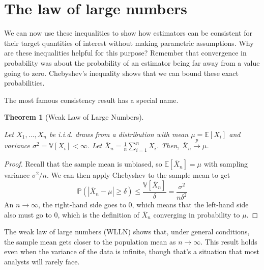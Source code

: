 \documentclass[
  letterpaper,
  DIV=11,
  numbers=noendperiod]{scrreprt}
\newcommand{\E}{\mathbb{E}}
\newcommand{\V}{\mathbb{V}}
\renewcommand{\P}{\mathbb{P}}
\newcommand{\Xbar}{\overline{X}}
\newcommand{\inprob}{\overset{p}{\to}}
\theoremstyle{definition}
\theoremstyle{plain}
\newtheorem{theorem}{Theorem}[chapter]
\theoremstyle{definition}
\theoremstyle{remark}
\begin{document}
\hypertarget{the-law-of-large-numbers}{%
\section{The law of large numbers}\label{the-law-of-large-numbers}}

We can now use these inequalities to show how estimators can be
consistent for their target quantities of interest without making
parametric assumptions. Why are these inequalities helpful for this
purpose? Remember that convergence in probability was about the
probability of an estimator being far away from a value going to zero.
Chebyshev's inequality shows that we can bound these exact
probabilities.

The most famous consistency result has a special name.

\begin{theorem}[Weak Law of Large
Numbers]\protect\hypertarget{thm-lln}{}\label{thm-lln}

Let \(X_1, \ldots, X_n\) be i.i.d. draws from a distribution with mean
\(\mu = \E[X_i]\) and variance \(\sigma^2 = \V[X_i] < \infty\). Let
\(\Xbar_n = \frac{1}{n} \sum_{i =1}^n X_i\). Then,
\(\Xbar_n \inprob \mu\).

\end{theorem}

\begin{proof}

Recall that the sample mean is unbiased, so \(\E[\Xbar_n] = \mu\) with
sampling variance \(\sigma^2/n\). We can then apply Chebyshev to the
sample mean to get \[
\P(|\Xbar_n - \mu| \geq \delta) \leq \frac{\V[\Xbar_n]}{\delta} = \frac{\sigma^2}{n\delta^2}
\] An \(n\rightarrow\infty\), the right-hand side goes to 0, which means
that the left-hand side also must go to 0, which is the definition of
\(\Xbar_n\) converging in probability to \(\mu\).

\end{proof}

The weak law of large numbers (WLLN) shows that, under general
conditions, the sample mean gets closer to the population mean as
\(n\rightarrow\infty\). This result holds even when the variance of the
data is infinite, though that's a situation that most analysts will
rarely face.
\end{document}
